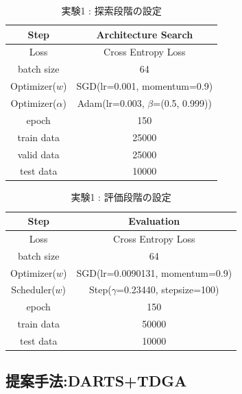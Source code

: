 \begin{table}[tb]
  \begin{center}
    \caption{実験1 : 探索段階の設定}
  	\vspace{3mm}
    \begin{tabular}{|c|c|} \hline
      Step & Architecture Search \\ \hline\hline
      Loss & Cross Entropy Loss \\ \hline
      batch size & 64 \\ \hline
      Optimizer($w$) & SGD(lr=0.001, momentum=0.9) \\ \hline
      Optimizer($\alpha$) & Adam(lr=0.003, $\beta$=(0.5, 0.999)) \\ \hline
      epoch & 150\\ \hline
      train data & 25000\\ \hline
      valid data & 25000\\ \hline
      test data &  10000\\ \hline
    \end{tabular}
    \label{tab:setting_exp}
  \end{center}
\end{table}

\begin{table}[tb]
  \begin{center}
    \caption{実験1 : 評価段階の設定}
  	\vspace{3mm}
    \begin{tabular}{|c|c|} \hline
      Step & Evaluation \\ \hline\hline
      Loss & Cross Entropy Loss \\ \hline
      batch size & 64 \\ \hline
      Optimizer($w$) & SGD(lr=0.0090131, momentum=0.9) \\ \hline
      Scheduler($w$) & Step($\gamma$=0.23440, stepsize=100) \\ \hline
      epoch & 150\\ \hline
      train data & 50000\\ \hline
      test data &  10000\\ \hline
    \end{tabular}
    \label{tab:setting_eval}
  \end{center}
\end{table}


\clearpage\newpage
\changeindent{0cm}
\subsection{提案手法:DARTS+TDGA}
\label{sec:pred.02}
\changeindent{2cm}

